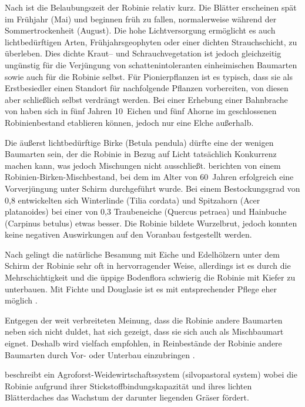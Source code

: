 \documentclass[twocolumn]{scrartcl}
\begin{document}
Nach \citet{vitkova2017robinie} ist die Belaubungszeit der Robinie
relativ kurz. Die Blätter erscheinen spät im Frühjahr (Mai) und
beginnen früh zu fallen, normalerweise während der Sommertrockenheit
(August). Die hohe Lichtversorgung ermöglicht es auch lichtbedürftigen
Arten, Frühjahrsgeophyten oder einer dichten Strauchschicht, zu
überleben. Dies dichte Kraut-- und Schrauchvegetation ist jedoch
gleichzeitig ungünstig für die Verjüngung von schattenintoleranten
einheimischen Baumarten sowie auch für die Robinie selbst. Für
Pionierpflanzen ist es typisch, dass sie als Erstbesiedler einen
Standort für nachfolgende Pflanzen vorbereiten, von diesen aber
schließlich selbst verdrängt werden. Bei einer Erhebung einer
Bahnbrache von \citet{kowarik1996robinie} haben sich in fünf Jahren
10~Eichen und fünf Ahorne im geschlossenen Robinienbestand etablieren
können, jedoch nur eine Elche außerhalb.

Die äußerst lichtbedürftige Birke (Betula pendula) dürfte eine der
wenigen Baumarten sein, der die Robinie in Bezug auf Licht tatsächlich
Konkurrenz machen kann, was jedoch Mischungen nicht
ausschließt.
\citet{gaier2009robinieVorverjuengung} berichten von einem
Robinien-Birken-Mischbestand, bei dem im Alter von 60~Jahren
erfolgreich eine Vorverjüngung unter Schirm durchgeführt wurde.  Bei
einem Bestockungsgrad von 0,8 entwickelten sich Winterlinde (Tilia
cordata) und Spitzahorn (Acer platanoides) bei einer von 0,3
Traubeneiche (Quercus petraea) und Hainbuche (Carpinus betulus) etwas
besser.  Die Robinie bildete Wurzelbrut, jedoch konnten keine
negativen Auswirkungen auf den Voranbau festgestellt werden.

Nach \citet[S.~19]{erteld1952robinieErtrag}
gelingt die natürliche Besamung mit Eiche und Edelhölzern
unter dem Schirm der Robinie sehr oft in  hervorragender Weise,
allerdings ist es durch die
Mehrschichtigkeit und die üppige Bodenflora schwierig die Robinie mit
Kiefer zu unterbauen. Mit Fichte und Douglasie ist es mit
entsprechender Pflege eher möglich \citep[S.~94]{erteld1952robinieErtrag}.

Entgegen der weit verbreiteten Meinung, dass die Robinie andere
Baumarten neben sich nicht duldet, hat sich gezeigt, dass sie sich
auch als Mischbaumart eignet. Deshalb wird vielfach empfohlen, in
Reinbestände der Robinie andere Baumarten durch Vor- oder Unterbau
einzubringen \citep{ewald2001klone}.

\citet[p.\,467, 586]{ashton2018silviculture} beschreibt ein
Agroforst-Weidewirtschaftssystem (silvopastoral system) wobei die
Robinie aufgrund ihrer Stickstoffbindungskapazität und ihres lichten
Blätterdaches das Wachstum der darunter liegenden Gräser fördert.
\end{document}
